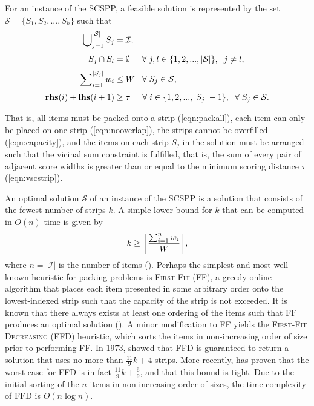 \documentclass[oribibl]{llncs}
\begin{document}
For an instance of the SCSPP, a feasible solution is represented by the set $\mathcal{S} = \{S_1, S_2, ..., S_k\}$ such that
\begin{subequations}
	\begin{align}
		\bigcup\nolimits_{j=1}^{|\mathcal{S}|} S_j &= \mathcal{I}, \label{eqn:packall}\\[3pt]
		S_j \cap S_l &= \emptyset \hspace{5mm} \forall \hspace{1mm} j, l \in \{1, 2, ..., |\mathcal{S}|\}, \hspace{2mm} j \neq l, \label{eqn:nooverlap} \\[3pt]
		\sum\nolimits_{i=1}^{|S_j|}w_i & \leq W \hspace{3mm} \forall \hspace{1mm} S_j \in \mathcal{S}, \label{eqn:capacity} \\[3pt]
		\textup{\textbf{rhs}}(i) + \textup{\textbf{lhs}}(i+1) &\geq \tau \hspace {5mm} \forall \hspace{1mm} i \in \{1, 2, ..., |S_j|-1\}, \hspace{2mm} \forall \hspace{1mm} S_j \in \mathcal{S}. \label{eqn:vscstrip}
\end{align}
\end{subequations}

That is, all items must be packed onto a strip (\ref{eqn:packall}), each item can only be placed on one strip (\ref{eqn:nooverlap}), the strips cannot be overfilled (\ref{eqn:capacity}), and the items on each strip $S_j$ in the solution must be arranged such that the vicinal sum constraint is fulfilled, that is, the sum of every pair of adjacent score widths is greater than or equal to the minimum scoring distance $\tau$ (\ref{eqn:vscstrip}).

An optimal solution $\mathcal{S}$ of an instance of the SCSPP is a solution that consists of the fewest number of strips $k$. A simple lower bound for $k$ that can be computed in $O(n)$ time is given by 
\begin{equation}
\label{eqn:lowerbound}
k \geq \ceil*{\frac{\sum_{i=1}^{n}w_i}{W}},
\end{equation}
where $n = |\mathcal{I}|$ is the number of items (\citealp{martello1990b}). Perhaps the simplest and most well-known heuristic for packing problems is \textsc{First-Fit} (FF), a greedy online algorithm that places each item presented in some arbitrary order onto the lowest-indexed strip such that the capacity of the strip is not exceeded. It is known that there always exists at least one ordering of the items such that FF produces an optimal solution (\citealp{lewis2009}). A minor modification to FF yields the \textsc{First-Fit Decreasing} (FFD) heuristic, which sorts the items in non-increasing order of size prior to performing FF. In 1973, \citeauthor{johnson1973} showed that FFD is guaranteed to return a solution that uses no more than $\frac{11}{9}k + 4$ strips. More recently, \cite{dosa2007} has proven that the worst case for FFD is in fact $\frac{11}{9}k + \frac{6}{9}$, and that this bound is tight. Due to the initial sorting of the $n$ items in non-increasing order of sizes, the time complexity of FFD is $O(n\log n)$.
\end{document}
